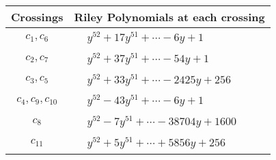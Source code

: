 \documentclass[1p]{elsarticle_modified}
\theoremstyle{definition}
\begin{document}
\begin{tabular}{m{50pt}|m{274pt}}
Crossings & \hspace{64pt}Riley Polynomials at each crossing \\
\hline $$\begin{aligned}c_{1},c_{6}\end{aligned}$$&$\begin{aligned}
&y^{52}+17 y^{51}+\cdots-6 y+1
\end{aligned}$\\
\hline $$\begin{aligned}c_{2},c_{7}\end{aligned}$$&$\begin{aligned}
&y^{52}+37 y^{51}+\cdots-54 y+1
\end{aligned}$\\
\hline $$\begin{aligned}c_{3},c_{5}\end{aligned}$$&$\begin{aligned}
&y^{52}+33 y^{51}+\cdots-2425 y+256
\end{aligned}$\\
\hline $$\begin{aligned}c_{4},c_{9},c_{10}\end{aligned}$$&$\begin{aligned}
&y^{52}-43 y^{51}+\cdots-6 y+1
\end{aligned}$\\
\hline $$\begin{aligned}c_{8}\end{aligned}$$&$\begin{aligned}
&y^{52}-7 y^{51}+\cdots-38704 y+1600
\end{aligned}$\\
\hline $$\begin{aligned}c_{11}\end{aligned}$$&$\begin{aligned}
&y^{52}+5 y^{51}+\cdots+5856 y+256
\end{aligned}$\\
\hline
\end{tabular}
\vskip 2pc
\end{document}
